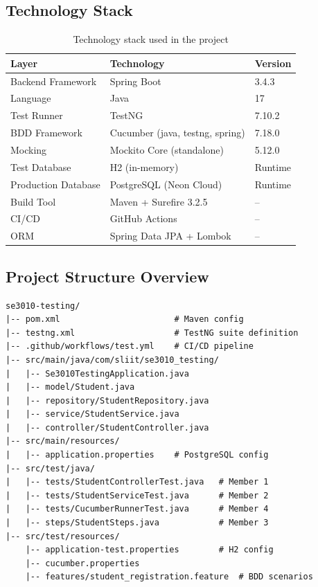 \documentclass[12pt,a4paper]{article}
\begin{document}
\subsection{Technology Stack}

\begin{table}[h!]
\centering
\begin{tabular}{lll}
    \toprule
    \textbf{Layer} & \textbf{Technology} & \textbf{Version} \\
    \midrule
    Backend Framework & Spring Boot & 3.4.3 \\
    Language & Java & 17 \\
    Test Runner & TestNG & 7.10.2 \\
    BDD Framework & Cucumber (java, testng, spring) & 7.18.0 \\
    Mocking & Mockito Core (standalone) & 5.12.0 \\
    Test Database & H2 (in-memory) & Runtime \\
    Production Database & PostgreSQL (Neon Cloud) & Runtime \\
    Build Tool & Maven + Surefire 3.2.5 & -- \\
    CI/CD & GitHub Actions & -- \\
    ORM & Spring Data JPA + Lombok & -- \\
    \bottomrule
\end{tabular}
\caption{Technology stack used in the project}
\end{table}

\subsection{Project Structure Overview}

\begin{lstlisting}[style=bashstyle, caption={Project directory structure}]
se3010-testing/
|-- pom.xml                       # Maven config
|-- testng.xml                    # TestNG suite definition
|-- .github/workflows/test.yml    # CI/CD pipeline
|-- src/main/java/com/sliit/se3010_testing/
|   |-- Se3010TestingApplication.java
|   |-- model/Student.java
|   |-- repository/StudentRepository.java
|   |-- service/StudentService.java
|   |-- controller/StudentController.java
|-- src/main/resources/
|   |-- application.properties    # PostgreSQL config
|-- src/test/java/
|   |-- tests/StudentControllerTest.java   # Member 1
|   |-- tests/StudentServiceTest.java      # Member 2
|   |-- tests/CucumberRunnerTest.java      # Member 4
|   |-- steps/StudentSteps.java            # Member 3
|-- src/test/resources/
    |-- application-test.properties        # H2 config
    |-- cucumber.properties
    |-- features/student_registration.feature  # BDD scenarios
\end{lstlisting}
\end{document}
